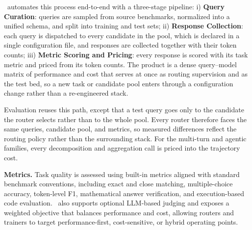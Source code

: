 \method\ automates this process end-to-end with a three-stage pipeline: i) \textbf{Query Curation}: queries are sampled from source benchmarks, normalized into a unified schema, and split into training and test sets; ii) \textbf{Response Collection}: each query is dispatched to every candidate in the pool, which is declared in a single configuration file, and responses are collected together with their token counts; iii) \textbf{Metric Scoring and Pricing}: every response is scored with its task metric and priced from its token counts. The product is a dense query--model matrix of performance and cost that serves at once as routing supervision and as the test bed, so a new task or candidate pool enters through a configuration change rather than a re-engineered stack.

Evaluation reuses this path, except that a test query goes only to the candidate the router selects rather than to the whole pool. Every router therefore faces the same queries, candidate pool, and metrics, so measured differences reflect the routing policy rather than the surrounding stack. For the multi-turn and agentic families, every decomposition and aggregation call is priced into the trajectory cost.

\noindent\textbf{Metrics.} Task quality is assessed using built-in metrics aligned with standard benchmark conventions, including exact and close matching, multiple-choice accuracy, token-level F1, mathematical answer verification, and execution-based code evaluation. \method\ also supports optional LLM-based judging and exposes a weighted objective that balances performance and cost, allowing routers and trainers to target performance-first, cost-sensitive, or hybrid operating points.

